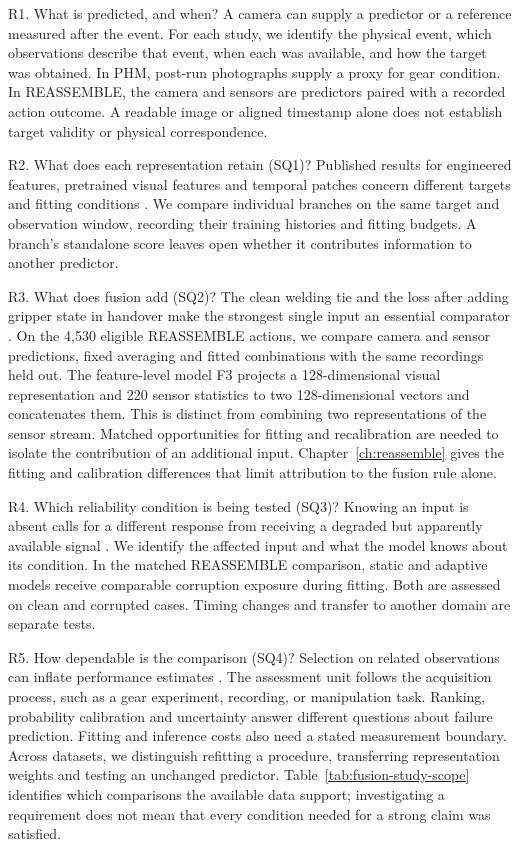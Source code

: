 R1. What is predicted, and when? A camera can supply a predictor or a
reference measured after the event. For each study, we identify the physical event,
which observations describe that event, when each was available, and how the target
was obtained. In PHM, post-run photographs supply a proxy for gear condition. In
REASSEMBLE, the camera and sensors are predictors paired with a recorded action
outcome. A readable image or aligned timestamp alone does not establish target
validity or physical correspondence.

R2. What does each representation retain (SQ1)? Published results for
engineered features, pretrained visual features and temporal patches concern
different targets and fitting conditions
\parencite{Horwitz2023Back,Roth2022Towards,Nie2023PatchTST}. We compare individual
branches on the same target and observation window, recording their training
histories and fitting budgets. A branch's standalone score leaves open whether it
contributes information to another predictor.

R3. What does fusion add (SQ2)? The clean welding tie and the loss after
adding gripper state in handover make the strongest single input an essential
comparator \parencite{Hua2026Weld,Thoduka2024Handover}. On the 4,530 eligible
REASSEMBLE actions, we compare camera and sensor predictions, fixed averaging and
fitted combinations with the same recordings held out. The feature-level model F3
projects a 128-dimensional visual representation and 220 sensor statistics to two
128-dimensional vectors and concatenates them. This is distinct from combining
two representations of the sensor stream. Matched opportunities for fitting and
recalibration are needed to isolate the contribution of an additional input.
Chapter~\ref{ch:reassemble} gives the fitting and calibration differences that
limit attribution to the fusion rule alone.

R4. Which reliability condition is being tested (SQ3)? Knowing an input is
absent calls for a different response from receiving a degraded but apparently
available signal \parencite{P026,Zhang2023QMF}. We identify the affected input and
what the model knows about its condition. In the matched REASSEMBLE comparison,
static and adaptive models receive comparable corruption exposure during fitting.
Both are assessed on clean and corrupted cases. Timing changes and transfer to
another domain are separate tests.

R5. How dependable is the comparison (SQ4)? Selection on related
observations can inflate performance estimates \parencite{P004,P017}. The
assessment unit follows the acquisition process, such as a gear experiment,
recording, or manipulation task. Ranking, probability calibration and uncertainty
answer different questions about failure prediction. Fitting and inference costs
also need a stated measurement boundary. Across datasets, we distinguish refitting
a procedure, transferring representation weights and testing an unchanged
predictor. Table~\ref{tab:fusion-study-scope} identifies which comparisons the
available data support; investigating a requirement does not mean that every
condition needed for a strong claim was satisfied.

